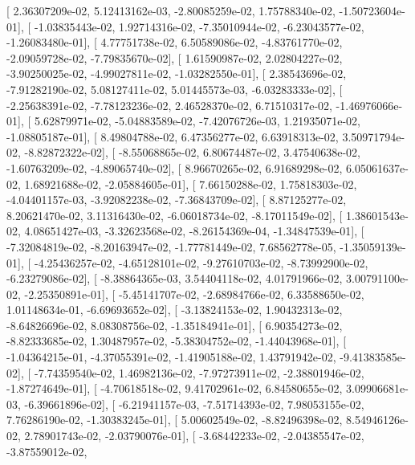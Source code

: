 \documentclass{article}
\begin{document}
       [  2.36307209e-02,   5.12413162e-03,  -2.80085259e-02,
          1.75788340e-02,  -1.50723604e-01],
       [ -1.03835443e-02,   1.92714316e-02,  -7.35010944e-02,
         -6.23043577e-02,  -1.26083480e-01],
       [  4.77751738e-02,   6.50589086e-02,  -4.83761770e-02,
         -2.09059728e-02,  -7.79835670e-02],
       [  1.61590987e-02,   2.02804227e-02,  -3.90250025e-02,
         -4.99027811e-02,  -1.03282550e-01],
       [  2.38543696e-02,  -7.91282190e-02,   5.08127411e-02,
          5.01445573e-03,  -6.03283333e-02],
       [ -2.25638391e-02,  -7.78123236e-02,   2.46528370e-02,
          6.71510317e-02,  -1.46976066e-01],
       [  5.62879971e-02,  -5.04883589e-02,  -7.42076726e-03,
          1.21935071e-02,  -1.08805187e-01],
       [  8.49804788e-02,   6.47356277e-02,   6.63918313e-02,
          3.50971794e-02,  -8.82872322e-02],
       [ -8.55068865e-02,   6.80674487e-02,   3.47540638e-02,
         -1.60763209e-02,  -4.89065740e-02],
       [  8.96670265e-02,   6.91689298e-02,   6.05061637e-02,
          1.68921688e-02,  -2.05884605e-01],
       [  7.66150288e-02,   1.75818303e-02,  -4.04401157e-03,
         -3.92082238e-02,  -7.36843709e-02],
       [  8.87125277e-02,   8.20621470e-02,   3.11316430e-02,
         -6.06018734e-02,  -8.17011549e-02],
       [  1.38601543e-02,   4.08651427e-03,  -3.32623568e-02,
         -8.26154369e-04,  -1.34847539e-01],
       [ -7.32084819e-02,  -8.20163947e-02,  -1.77781449e-02,
          7.68562778e-05,  -1.35059139e-01],
       [ -4.25436257e-02,  -4.65128101e-02,  -9.27610703e-02,
         -8.73992900e-02,  -6.23279086e-02],
       [ -8.38864365e-03,   3.54404118e-02,   4.01791966e-02,
          3.00791100e-02,  -2.25350891e-01],
       [ -5.45141707e-02,  -2.68984766e-02,   6.33588650e-02,
          1.01148634e-01,  -6.69693652e-02],
       [ -3.13824153e-02,   1.90432313e-02,  -8.64826696e-02,
          8.08308756e-02,  -1.35184941e-01],
       [  6.90354273e-02,  -8.82333685e-02,   1.30487957e-02,
         -5.38304752e-02,  -1.44043968e-01],
       [ -1.04364215e-01,  -4.37055391e-02,  -1.41905188e-02,
          1.43791942e-02,  -9.41383585e-02],
       [ -7.74359540e-02,   1.46982136e-02,  -7.97273911e-02,
         -2.38801946e-02,  -1.87274649e-01],
       [ -4.70618518e-02,   9.41702961e-02,   6.84580655e-02,
          3.09906681e-03,  -6.39661896e-02],
       [ -6.21941157e-03,  -7.51714393e-02,   7.98053155e-02,
          7.76286190e-02,  -1.30383245e-01],
       [  5.00602549e-02,  -8.82496398e-02,   8.54946126e-02,
          2.78901743e-02,  -2.03790076e-01],
       [ -3.68442233e-02,  -2.04385547e-02,  -3.87559012e-02,
\end{document}
